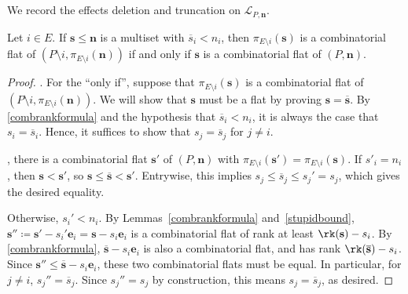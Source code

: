\subsection{}\label{comboflatsdeletiontruncation}
We record the effects deletion and truncation on $\mathcal L_{P, \mathbf n}$.
\begin{lemm}\label{localproduct}
  Let $i \in E$. If $\mathbf s \leq \mathbf n$ is a multiset with $\overline s_i < n_i$, then $\pi_{E \setminus i}(\mathbf s)$ is a combinatorial flat of $(P \setminus i, \pi_{E \setminus i}(\mathbf n))$ if and only if $\mathbf s$ is a combinatorial flat of $(P, \mathbf n)$.
\end{lemm}
\begin{proof}
  .
  For the ``only if'', suppose that $\pi_{E \setminus i}(\mathbf s)$ is a combinatorial flat of $(P \setminus i, \pi_{E \setminus i}(\mathbf n))$. We will show that $\mathbf s$ must be a flat by proving $\mathbf s = \overline{\mathbf s}$.
  By \cref{combrankformula} and the hypothesis that $\overline s_i < n_i$, it is always the case that $s_i = \overline s_i$.
  Hence, it suffices to show that $s_j = \overline s_j$ for $j \neq i$.

  , there is a combinatorial flat $\mathbf s'$ of $(P, \mathbf n)$ with $\pi_{E \setminus i}(\mathbf s') = \pi_{E \setminus i}(\mathbf s)$.
  If $s'_i = n_i$, then $\mathbf s < \mathbf s'$, so $\mathbf s \leq \overline{\mathbf s} < \mathbf s'$.
  Entrywise, this implies $s_j \leq \overline s_j \leq s_j' = s_j$, which gives the desired equality.
  
  Otherwise,  $s_i' < n_i$.
  By Lemmas~\ref{combrankformula} and~\ref{stupidbound}, $\mathbf s'' \coloneqq \mathbf s' - s_i' \mathbf e_i = \mathbf s - s_i \mathbf e_i$ is a combinatorial flat of rank at least $\rk(\mathbf s) - s_i$.
  By \cref{combrankformula}, $\overline{\mathbf s} - s_i \mathbf e_i$ is also a combinatorial flat, and has rank $\rk(\overline{\mathbf s}) - s_i$.
  Since $\mathbf s'' \leq \overline{\mathbf s} - s_i \mathbf e_i$, these two combinatorial flats must be equal.
  In particular, for $j \neq i$, $s_j'' = \overline s_j$. Since $s_j'' = s_j$ by construction, this means $s_j =\overline s_j$, as desired.
\end{proof}


